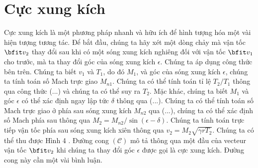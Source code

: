 \documentclass[DONG_CHAY_NEN_DUOC.tex]{subfiles}
\begin{document}
\section{Cực xung kích}
Cực xung kích là một phương pháp nhanh và hữu ích để hình tượng hóa một vài hiện tượng tương tác. Để bắt đầu, chúng ta hãy xét một dòng chảy mà vận tốc $\bfit v_2$ thay đổi sau khi có một sóng xung kích nghiêng đối với vận tốc $\bfit v_1$ cho trước, mà ta thay đổi góc của sóng xung kích $\epsilon$. Chúng ta áp dụng công thức bên trên. Chúng ta biết $v_1$ và $T_1$, do đó $M_1$, và góc của sóng xung kích $\epsilon$, chúng ta tính toán số Mach trực giao $M_{n1}$. Chúng ta có thể tính toán tỉ lệ $T_2/T_1$ thông qua công thức (...) và chúng ta có thể suy ra $T_2$. Mặc khác, chúng ta biết $M_1$ và góc $\epsilon$ có thể xác định ngay lập tức $\delta$ thông qua (...). Chúng ta có thể tính toán số Mach trực giao ở phía sau sóng xung kích $M_{n2}$ qua (...), chúng ta có thể xác định số Mach phía sau thông qua $M_2 = M_{n2}/\sin(\epsilon-\delta)$. Chúng ta tính toán trực tiếp vận tốc phía sau sóng xung kích xiên thông qua $v_2=M_2\sqrt{\gamma rT_2}$. Chúng ta có thể thu được Hình 4 . Đường cong $(\mathcal{C})$ mô tả thông qua một đầu của vecteur vận tốc $\bfit v_2$ khi chúng ta thay đổi góc $\epsilon$ được gọi là cực xung kích. Đường cong này cần một vài bình luận.






	
\end{document}
